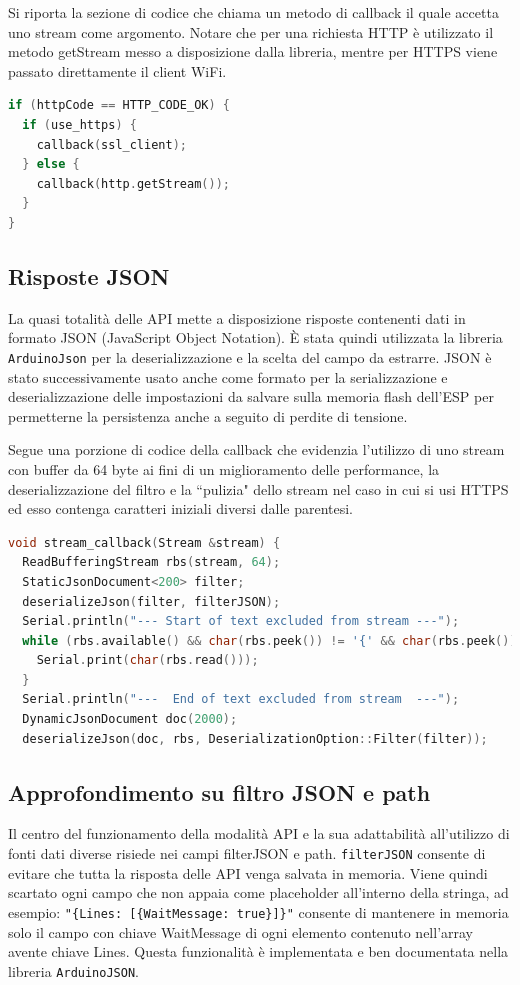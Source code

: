 \documentclass[12pt,a4paper]{report}
\begin{document}
Si riporta la sezione di codice che chiama un metodo di callback il quale accetta uno stream come argomento. Notare che per una richiesta
HTTP è utilizzato il metodo getStream messo a disposizione dalla libreria, mentre per HTTPS viene passato direttamente il client WiFi.
\begin{lstlisting}[language=cpp]
if (httpCode == HTTP_CODE_OK) {
  if (use_https) {
    callback(ssl_client);
  } else {
    callback(http.getStream());
  }
}
\end{lstlisting}

\subsection{Risposte JSON}
La quasi totalità delle API mette a disposizione risposte contenenti dati in formato JSON (JavaScript Object Notation). È stata quindi
utilizzata la libreria \texttt{ArduinoJson} per la deserializzazione e la scelta del campo da estrarre.
JSON è stato successivamente usato anche come formato per la serializzazione e deserializzazione delle impostazioni da salvare sulla
memoria flash dell'ESP per permetterne la persistenza anche a seguito di perdite di tensione.

Segue una porzione di codice della callback che evidenzia l'utilizzo di uno stream con buffer da 64 byte ai fini di un miglioramento delle
performance, la deserializzazione del filtro e la ``pulizia" dello stream nel caso in cui si usi HTTPS ed esso contenga caratteri iniziali
diversi dalle parentesi.
\begin{lstlisting}[language=cpp]
void stream_callback(Stream &stream) {
  ReadBufferingStream rbs(stream, 64);
  StaticJsonDocument<200> filter;
  deserializeJson(filter, filterJSON);
  Serial.println("--- Start of text excluded from stream ---");
  while (rbs.available() && char(rbs.peek()) != '{' && char(rbs.peek()) != '[') {
    Serial.print(char(rbs.read()));
  }
  Serial.println("---  End of text excluded from stream  ---");
  DynamicJsonDocument doc(2000);
  deserializeJson(doc, rbs, DeserializationOption::Filter(filter));
\end{lstlisting}

\subsection{Approfondimento su filtro JSON e path}
Il centro del funzionamento della modalità API e la sua adattabilità all'utilizzo di fonti dati diverse risiede nei campi
filterJSON e path.
\texttt{filterJSON} consente di evitare che tutta la risposta delle API venga salvata in memoria. Viene quindi scartato ogni campo che non
appaia come placeholder all'interno della stringa, ad esempio:
\texttt{"\{Lines: [\{WaitMessage: true\}]\}"} consente di mantenere
in memoria solo il campo con chiave WaitMessage di ogni elemento contenuto nell'array avente chiave Lines. Questa funzionalità è
implementata e ben documentata nella libreria \texttt{ArduinoJSON}.~\cite{arduinojsonfiltering}
\end{document}
